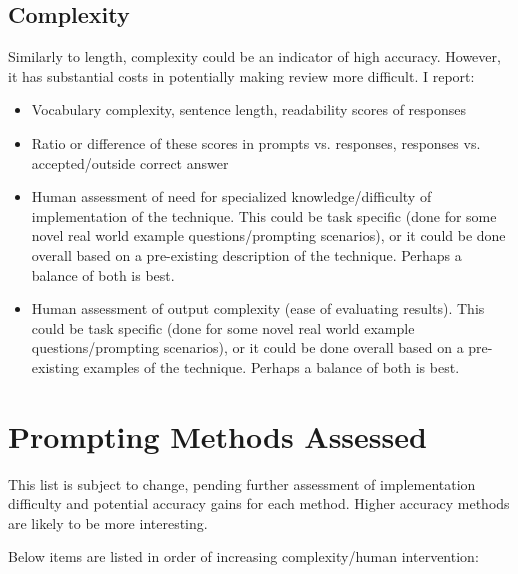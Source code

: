 \documentclass[11pt]{article}
\begin{document}
\subsection*{Complexity}

Similarly to length, complexity could be an indicator of high accuracy. However, it has substantial costs in potentially making review more difficult. I report:

\begin{itemize}
  \item Vocabulary complexity, sentence length, readability scores of responses
  \item Ratio or difference of these scores in prompts vs. responses, responses vs. accepted/outside correct answer
  \item Human assessment of need for specialized knowledge/difficulty of implementation of the technique. This could be task specific (done for some novel real world example questions/prompting scenarios), or it could be done overall based on a pre-existing description of the technique. Perhaps a balance of both is best.
  \item Human assessment of output complexity (ease of evaluating results). This could be task specific (done for some novel real world example questions/prompting scenarios), or it could be done overall based on a pre-existing examples of the technique. Perhaps a balance of both is best.
\end{itemize}

\section*{Prompting Methods Assessed}

This list is subject to change, pending further assessment of implementation difficulty and potential accuracy gains for each method. Higher accuracy methods are likely to be more interesting.

Below items are listed in order of increasing complexity/human intervention:
\end{document}
